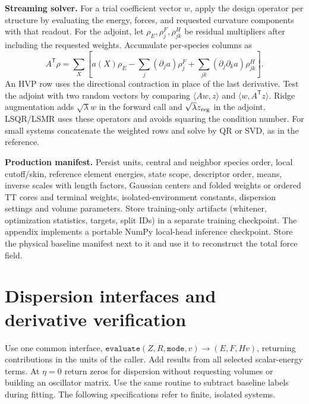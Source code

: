 \documentclass[11pt,a4paper]{article}
\newcommand{\T}{\mathsf T}\newcommand{\tr}{\operatorname{tr}}
\begin{document}
\textbf{Streaming solver.} For a trial coefficient vector $w$, apply the design operator per structure by evaluating the energy, forces, and requested curvature components with that readout. For the adjoint, let $\rho_E,\rho^F_j,\rho^H_{jk}$ be residual multipliers after including the requested weights. Accumulate per-species columns as
\[
 A^\T\rho=\sum_X\left[a(X)\rho_E-\sum_j(\partial_j a)\rho^F_j
       +\sum_{jk}(\partial_j\partial_k a)\rho^H_{jk}\right].
\]
An HVP row uses the directional contraction in place of the last derivative. Test the adjoint with two random vectors by comparing $\langle Aw,z\rangle$ and $\langle w,A^\T z\rangle$. Ridge augmentation adds $\sqrt\lambda w$ in the forward call and $\sqrt\lambda z_{\rm reg}$ in the adjoint. LSQR/LSMR uses these operators and avoids squaring the condition number. For small systems concatenate the weighted rows and solve by QR or SVD, as in the reference.

\textbf{Production manifest.} Persist units, central and neighbor species order, local cutoff/skin, reference element energies, state scope, descriptor order, means, inverse scales with length factors, Gaussian centers and folded weights or ordered TT cores and terminal weights, isolated-environment constants, dispersion settings and volume parameters. Store training-only artifacts (whitener, optimization statistics, targets, split IDs) in a separate training checkpoint. The appendix implements a portable NumPy local-head inference checkpoint. Store the physical baseline manifest next to it and use it to reconstruct the total force field.

\pg\section{Dispersion interfaces and derivative verification}\label{sec:physapi}
Use one common interface, $\texttt{evaluate}(Z,R,\texttt{mode},v)\to(E,F,Hv)$, returning contributions in the units of the caller. Add results from all selected scalar-energy terms. At $\eta=0$ return zeros for dispersion without requesting volumes or building an oscillator matrix. Use the same routine to subtract baseline labels during fitting. The following specifications refer to finite, isolated systems.
\end{document}
